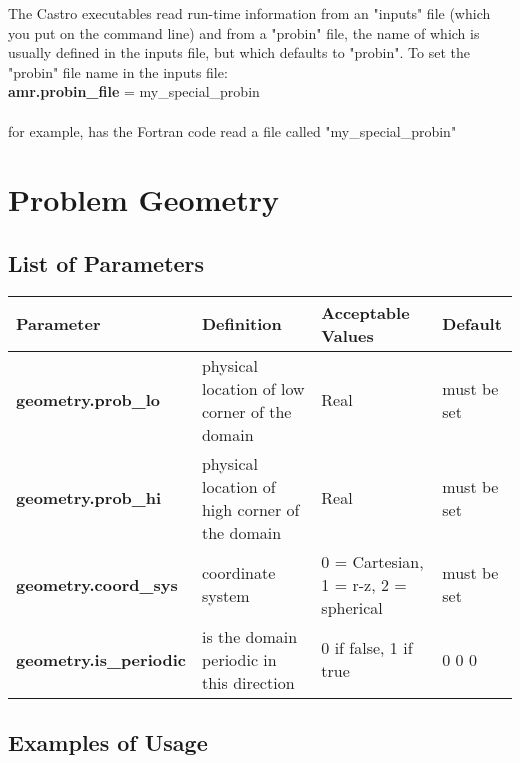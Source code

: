 The Castro executables read run-time information from an "inputs" file (which you put on the command line) 
and from a "probin" file, the name of which is usually defined in the inputs file, but which defaults to "probin".  
To set the "probin" file name in the inputs file:\\

{\bf amr.probin\_file} = my\_special\_probin\\ \\
for example, has the Fortran code read a file called "my\_special\_probin"

\section{Problem Geometry}

\subsection{List of Parameters}

\begin{table*}[h]
\begin{scriptsize}
\begin{tabular}{|l|l|l|l|} \hline
Parameter & Definition & Acceptable Values & Default \\
\hline
{\bf geometry.prob\_lo} & physical location of low corner of the domain & Real & must be set\\
{\bf geometry.prob\_hi} & physical location of high corner of the domain & Real  & must be set\\
{\bf geometry.coord\_sys} & coordinate system & 0 = Cartesian, 1 = r-z, 2 = spherical & must be set \\
{\bf geometry.is\_periodic} & is the domain periodic in this direction & 0 if false, 1 if true  & 0 0 0 \\
\hline
\end{tabular}
\label{Table:Geometry}
\end{scriptsize}
\end{table*}

\subsection{Examples of Usage}

